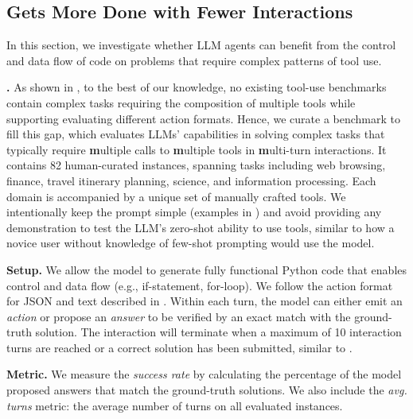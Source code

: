 \subsection{\approach Gets More Done with Fewer Interactions}
\label{sec:control-data-flow}


In this section, we investigate whether LLM agents can benefit from the control and data flow of code on problems that require complex patterns of tool use.

\noindent \textbf{\evalname.}
As shown in , to the best of our knowledge, no existing tool-use benchmarks contain complex tasks requiring the composition of multiple tools while supporting evaluating different action formats. Hence, we curate a benchmark \evalname to fill this gap, which evaluates LLMs' capabilities in solving complex tasks that typically require \textbf{m}ultiple calls to \textbf{m}ultiple tools in \textbf{m}ulti-turn interactions.
% 
It contains 82 human-curated instances, spanning tasks including web browsing, finance, travel itinerary planning, science, and information processing. 
% 
Each domain is accompanied by a unique set of manually crafted tools.
%
We intentionally keep the prompt simple (examples in ) and avoid providing any demonstration to test the LLM's zero-shot ability to use tools, similar to how a novice user without knowledge of few-shot prompting would use the model.
% 

\noindent \textbf{Setup.}
We allow the model to generate fully functional Python code that enables control and data flow (e.g., if-statement, for-loop). We follow the action format for JSON and text described in .
% 
Within each turn, the model can either emit an \textit{action} or propose an \textit{answer} to be verified by an exact match with the ground-truth solution.
The interaction will terminate when a maximum of 10 interaction turns are reached or a correct solution has been submitted, similar to \cite{wang2023mint}.

\noindent \textbf{Metric.} We measure the \textit{success rate} by calculating the percentage of the model proposed answers that match the ground-truth solutions. We also include the \textit{avg. turns} metric: the average number of turns on all evaluated instances.

